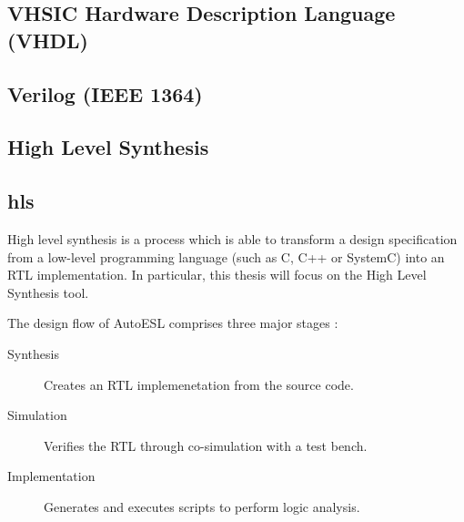 \subsection{VHSIC Hardware Description Language (VHDL)}
\label{vhdl}

\subsection{Verilog (IEEE 1364)}
\label{verilog}

\subsection{High Level Synthesis}
\subsection{hls}
High level synthesis is a process which is able to transform a design
specification from a low-level programming language (such as C, C++ or SystemC)
into an \gls{RTL} implementation. In particular, this thesis will focus on the
 High Level Synthesis tool.

The design flow of AutoESL comprises three major stages \cite{XILINX:Tutorial}:
\begin{description}
    \item[Synthesis] Creates an \gls{RTL} implemenetation from the source code.
    \item[Simulation] Verifies the \gls{RTL} through co-simulation with a test
        bench.
    \item[Implementation] Generates and executes scripts to perform logic
        analysis.
\end{description}
